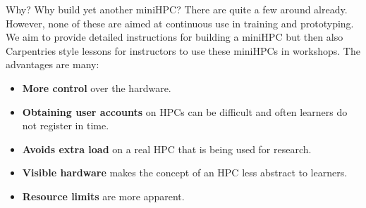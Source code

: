 \documentclass[final]{beamer}
\newlength{\colwidth}
\begin{document}
\begin{frame}[t]
\begin{columns}[t]
\begin{column}{\colwidth}
				\begin{alertblock}{Why?}
					Why build yet another miniHPC? There are quite a few around already. However, none of these 
					are aimed at continuous use in training and prototyping. We aim to provide detailed instructions
					for building a miniHPC but then also Carpentries style lessons for instructors to use these 
					miniHPCs in workshops. The advantages are many:
					
					\begin{itemize}
						\item \textbf{More control} over the hardware.
						\item \textbf{Obtaining user accounts} on HPCs can be difficult and often
						learners do not register in time.
						\item \textbf{Avoids extra load} on a real HPC that is being used for research.
						\item \textbf{Visible hardware} makes the concept of an HPC less abstract to learners.
						\item \textbf{Resource limits} are more apparent. 
					\end{itemize}
				\end{alertblock}		
					

\end{column}
\end{columns}
\end{frame}
\end{document}
